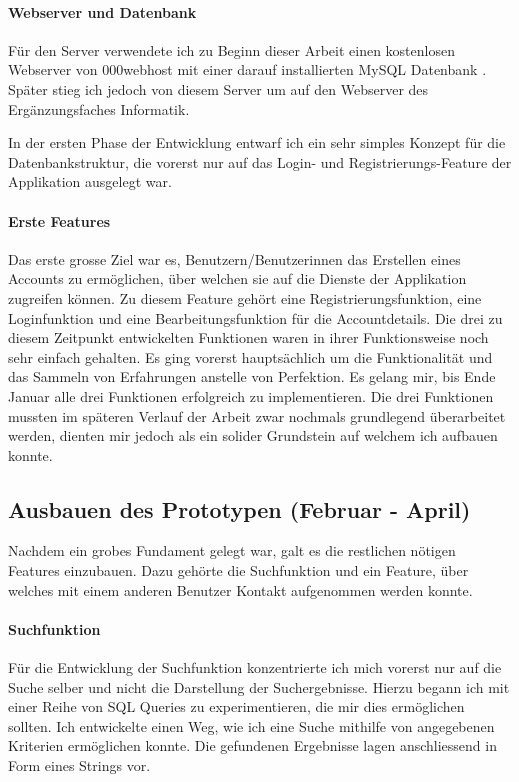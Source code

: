 \documentclass[../main.tex]{subfiles}
\begin{document}
	\paragraph{Webserver und Datenbank}
	Für den Server verwendete ich zu Beginn dieser Arbeit einen kostenlosen Webserver von 000webhost mit einer darauf installierten MySQL Datenbank \cite{webhost}. Später stieg ich jedoch von diesem Server um auf den Webserver des Ergänzungsfaches Informatik.
	
	In der ersten Phase der Entwicklung entwarf ich ein sehr simples Konzept für die Datenbankstruktur, die vorerst nur auf das Login- und Registrierungs-Feature der Applikation ausgelegt war.
	
	\paragraph{Erste Features}
	Das erste grosse Ziel war es, Benutzern/Benutzerinnen das Erstellen eines Accounts zu ermöglichen, über welchen sie auf die Dienste der Applikation zugreifen können. Zu diesem Feature gehört eine Registrierungsfunktion, eine Loginfunktion und eine Bearbeitungsfunktion für die Accountdetails. Die drei zu diesem Zeitpunkt entwickelten Funktionen waren in ihrer Funktionsweise noch sehr einfach gehalten. Es ging vorerst hauptsächlich um die Funktionalität und das Sammeln von Erfahrungen anstelle von Perfektion. Es gelang mir, bis Ende Januar alle drei Funktionen erfolgreich zu implementieren. Die drei Funktionen mussten im späteren Verlauf der Arbeit zwar nochmals grundlegend überarbeitet werden, dienten mir jedoch als ein solider Grundstein auf welchem ich aufbauen konnte.
	
	\subsection{Ausbauen des Prototypen (Februar - April)}
	Nachdem ein grobes Fundament gelegt war, galt es die restlichen nötigen Features einzubauen. Dazu gehörte die Suchfunktion und ein Feature, über welches mit einem anderen Benutzer Kontakt aufgenommen werden konnte.
	\paragraph{Suchfunktion}
	Für die Entwicklung der Suchfunktion konzentrierte ich mich vorerst nur auf die Suche selber und nicht die Darstellung der Suchergebnisse. Hierzu begann ich mit einer Reihe von SQL Queries zu experimentieren, die mir dies ermöglichen sollten. Ich entwickelte einen Weg, wie ich eine Suche mithilfe von angegebenen Kriterien ermöglichen konnte. Die gefundenen Ergebnisse lagen anschliessend in Form eines Strings vor. 
	
\end{document}
